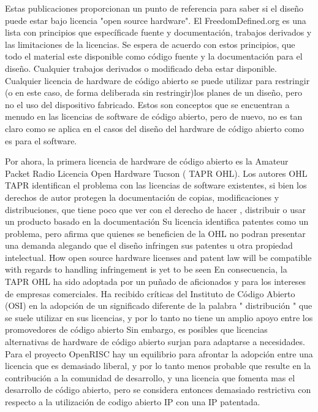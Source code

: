 \documentclass[a4paper,11pt]{article}
\begin{document}
Estas publicaciones proporcionan un punto de referencia para saber si el diseño puede estar bajo licencia "open source hardware".
El FreedomDefined.org es una lista con principios que específicade  fuente y  documentación, trabajos derivados y las limitaciones de la licencias. Se espera de acuerdo con estos principios, que todo el material este disponible como código fuente y la documentación para el diseño. Cualquier trabajos derivados o modificado deba estar disponible. 
Cualquier licencia de hardware de código abierto se puede utilizar para restringir (o en este caso, de forma deliberada sin restringir)los planes de un diseño, pero no el uso del dispositivo fabricado. Estos son conceptos que se encuentran a menudo en las licencias de software de código abierto, pero de nuevo, no es tan claro como se aplica en el casos del diseño del hardware de código abierto como es para el software. 

Por ahora, la primera licencia de hardware de código abierto es la  Amateur Packet Radio Licencia Open Hardware Tucson ( TAPR OHL). Los autores OHL TAPR identifican el problema con las licencias de software existentes, si bien los derechos de autor protegen la documentación de copias, modificaciones y distribuciones, que tiene poco que ver con el derecho de hacer , distribuir o usar un producto basado en la documentación %
Su licencia identifica patentes como un problema, pero afirma que quienes se beneficien de la OHL no podran
presentar una demanda alegando que el diseño infringen sus patentes u otra propiedad intelectual.
How open source hardware licenses and patent law will be compatible with regards to handling infringement is yet to be seen
En consecuencia, la TAPR OHL ha sido adoptada por un puñado de aficionados y para los intereses de empresas comerciales. Ha recibido críticas
del Instituto de Código Abierto (OSI) en la adopción de un significado diferente de la  palabra " distribución " que se suele utilizar en sus licencias, y por lo tanto no tiene un amplio apoyo entre los promovedores de código abierto%
Sin embargo, es posibles que licencias alternativas de hardware de código abierto surjan para adaptarse a necesidades.
Para el proyecto OpenRISC hay un equilibrio para afrontar la adopción entre una licencia que es demasiado liberal, y por lo tanto menos probable que resulte en la contribución a la comunidad de desarrollo, y una licencia que fomenta mas el desarrollo de código abierto, pero se considera entonces demasiado restrictiva con respecto a la utilización de codigo abierto IP con una IP patentada.
\end{document}
